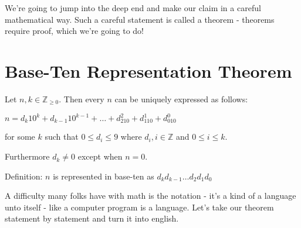 \documentclass{article}
\newenvironment{jprIn1}{\begin{adjustwidth}{3em}{}}{\end{adjustwidth}}
\begin{document}
We're going to jump into the deep end and make our claim in a careful mathematical way.
Such a careful statement is called a theorem - theorems require proof,
which we're going to do!

\section*{Base-Ten Representation Theorem}

\begin{jprIn1}
Let $n,k\in \mathbb{Z}_{\ge 0}$. Then every $n$ can be uniquely expressed as follows:

\hspace{3em}$n=d_k10^k+d_{k-1}10^{k-1}+\dots+d_210^2+d_110^1+d_010^0$

for some $k$ such that $0 \le d_i \le 9$ where $d_i,i\in\mathbb{Z}$ and $0 \le i \le k$.

Furthermore $d_k\ne0$ except when $n=0$.

Definition: $n$ is represented in base-ten as $d_kd_{k-1}\dots{}d_2d_1d_0$
\end{jprIn1}
\bigskip

A difficulty many folks have with math is the notation - it's
a kind of a language unto itself - like a computer program is a language.
Let's take our theorem statement by statement and turn it into english.
\end{document}
